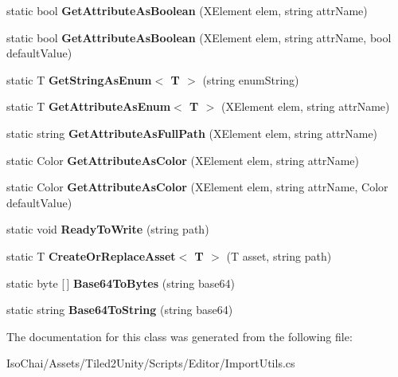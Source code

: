 \begin{DoxyCompactItemize}
static bool {\bfseries Get\+Attribute\+As\+Boolean} (X\+Element elem, string attr\+Name)
\item 
\mbox{\label{class_tiled2_unity_1_1_import_utils_a03cc67fb90080b345bcae6a3f4af6112}} 
static bool {\bfseries Get\+Attribute\+As\+Boolean} (X\+Element elem, string attr\+Name, bool default\+Value)
\item 
\mbox{\label{class_tiled2_unity_1_1_import_utils_a1bb629963e5bcce5b484d01463d79c47}} 
static T {\bfseries Get\+String\+As\+Enum$<$ T $>$} (string enum\+String)
\item 
\mbox{\label{class_tiled2_unity_1_1_import_utils_a13f4f397b11315cd4f235195985b694c}} 
static T {\bfseries Get\+Attribute\+As\+Enum$<$ T $>$} (X\+Element elem, string attr\+Name)
\item 
\mbox{\label{class_tiled2_unity_1_1_import_utils_aa49f3ec90727df791a864e99ac32ef60}} 
static string {\bfseries Get\+Attribute\+As\+Full\+Path} (X\+Element elem, string attr\+Name)
\item 
\mbox{\label{class_tiled2_unity_1_1_import_utils_a117905bc790ba993fb51f84ebf20d26a}} 
static Color {\bfseries Get\+Attribute\+As\+Color} (X\+Element elem, string attr\+Name)
\item 
\mbox{\label{class_tiled2_unity_1_1_import_utils_ae637054202cc20c1908d98d2b62e1927}} 
static Color {\bfseries Get\+Attribute\+As\+Color} (X\+Element elem, string attr\+Name, Color default\+Value)
\item 
\mbox{\label{class_tiled2_unity_1_1_import_utils_a11cec173605584ea154aaa5419a89234}} 
static void {\bfseries Ready\+To\+Write} (string path)
\item 
\mbox{\label{class_tiled2_unity_1_1_import_utils_a5e2d417ee1fb13a9e089c913752939ee}} 
static T {\bfseries Create\+Or\+Replace\+Asset$<$ T $>$} (T asset, string path)
\item 
\mbox{\label{class_tiled2_unity_1_1_import_utils_a1cc61166584f7ae7e358caf652cd4db7}} 
static byte \mbox{[}$\,$\mbox{]} {\bfseries Base64\+To\+Bytes} (string base64)
\item 
\mbox{\label{class_tiled2_unity_1_1_import_utils_a17abc9fcab7f46129163791fa9156b92}} 
static string {\bfseries Base64\+To\+String} (string base64)
\end{DoxyCompactItemize}


The documentation for this class was generated from the following file\+:\begin{DoxyCompactItemize}
\item 
Iso\+Chai/\+Assets/\+Tiled2\+Unity/\+Scripts/\+Editor/Import\+Utils.\+cs\end{DoxyCompactItemize}
